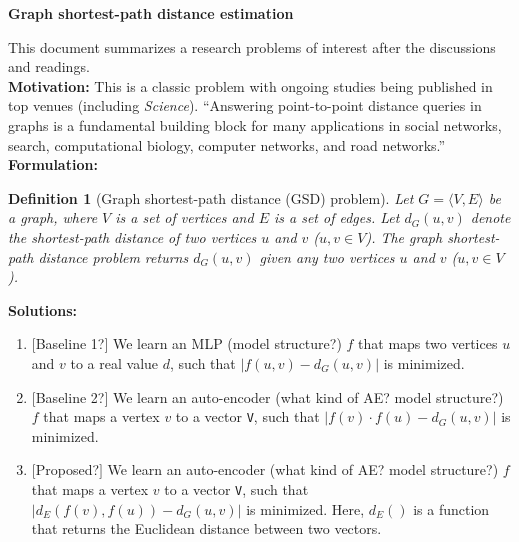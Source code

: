 \documentclass[]{report}   %
\newtheorem{defn}{Definition}
\begin{document}
\begin{center}
\textbf{Graph shortest-path distance estimation}\\


\end{center}

\noindent This document summarizes a research problems of interest after the discussions and readings.\\
 
\noindent
\textbf{Motivation:} This is a classic problem with ongoing studies being published in top venues (including \emph{Science}). 
``Answering point-to-point distance queries in graphs is a fundamental building
block for many applications in social networks, search, computational biology,
computer networks, and road networks.''
\\


\noindent
\textbf{Formulation:}

\begin{defn}[Graph shortest-path distance (GSD) problem]
Let  $G = \langle V, E  \rangle$ be a graph, where $V$ is a set of vertices and $E$ is a set of edges. 
Let $d_G(u, v)$ denote the shortest-path distance of two vertices $u$ and $v$ ($u, v \in V$).
The graph shortest-path distance problem returns $d_G(u, v)$ given any two vertices $u$ and $v$ ($u, v \in V$). 
\end{defn}

\noindent
\textbf{Solutions:}

\begin{enumerate}
\item {\color{red}$[$Baseline 1?$]$} We learn an MLP  {\color{red}(model structure?)} $f$ that maps two vertices  $u$ and $v$ to a real value $d$, such that $|f(u, v) - d_G(u,v)|$ is minimized. 

\item {\color{red}$[$Baseline 2?$]$} We learn an auto-encoder {\color{red}(what kind of AE? model structure?)} $f$ that maps a vertex $v$ to a vector \texttt{V}, such that $|f(v) \cdot f(u) - d_G(u, v)|$ is minimized. 

\item $[$Proposed?$]$ We learn an auto-encoder {\color{red}(what kind of AE? model structure?)} $f$ that maps a vertex $v$ to a vector \texttt{V}, such that $|d_E(f(v), f(u)) - d_G(u, v)|$ is minimized. Here, $d_E()$  
is a function that returns the Euclidean distance between two vectors. 

\end{enumerate}
\end{document}

